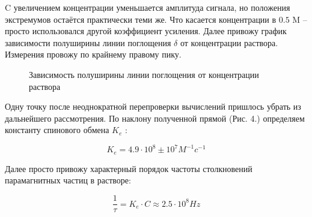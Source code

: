 \documentclass[a4paper,12pt]{article}
\theoremstyle{plain} %
\theoremstyle{definition} %
\theoremstyle{remark} %
\begin{document}
C увеличением концентрации уменьшается амплитуда сигнала, но положения экстремумов остаётся практически теми же.
Что касается концентрации в $0.5$ M -- просто использовался другой коэффициент усиления.
Далее привожу график зависимости полуширины линии поглощения $\delta $ от концентрации раствора. Измерения провожу по 
крайнему правому пику.

\begin{figure}[h!]
	\caption{Зависимость полуширины линии
		поглощения от концентрации
		раствора}
	\label{fig:image}
\end{figure}

Одну точку после неоднократной перепроверки вычислений пришлось убрать из дальнейшего рассмотрения.
По наклону полученной прямой (Рис. 4.) определяем константу спинового обмена $K_e $ :

\begin{equation}
	K_e = 4.9 \cdot 10^8 \pm 10^{7} M^{-1}c^{-1}
\end{equation}

\newpage
\setcounter{page}{12}
Далее просто привожу характерный порядок частоты столкновений парамагнитных частиц в растворе:

\begin{equation}
\frac{1}{\tau} = K_e \cdot C \approx 2.5 \cdot 10^8 Hz
\end{equation}
\end{document}
